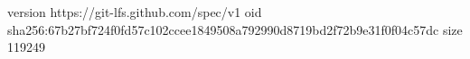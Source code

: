 version https://git-lfs.github.com/spec/v1
oid sha256:67b27bf724f0fd57c102ccee1849508a792990d8719bd2f72b9e31f0f04c57dc
size 119249
